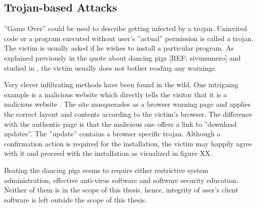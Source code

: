 \documentclass{tktltiki}
\begin{document}
      
    
\subsection{Trojan-based Attacks}

  ''Game Over'' could be used to describe getting infected by a trojan. Uninvited code or a program executed without user's ''actual'' permission is called a trojan. The victim is usually asked if he wishes to install a particular program. As explained previously in the quote about dancing pigs [REF: sivunumero] and studied in \cite{why_phishing_works_06}, the victim usually does not bother reading any warnings.

    Very clever infiltrating methods have been found in the wild. One intriguing example is a malicious website which directly tells the visitor that it is a malicious website \cite{fsecure_webtrojan_2010}. The site masquerades as a browser warning page and applies the correct layout and contents according to the victim's browser. The difference with the authentic page is that the malicious one offers a link to ''download updates''. The ''update'' contains a browser specific trojan. Although a confirmation action is required for the installation, the victim may happily agree with it and proceed with the installation as visualized in figure XX. 

        
%     
% 
%     


    Beating the dancing pigs \cite{schneier_secrets_and_lies_2000} seems to require either restrictive system administration, effective anti-virus software and software security education. Neither of them is in the scope of this thesis, hence, integrity of user's client software is left outside the scope of this thesis.
\end{document}
